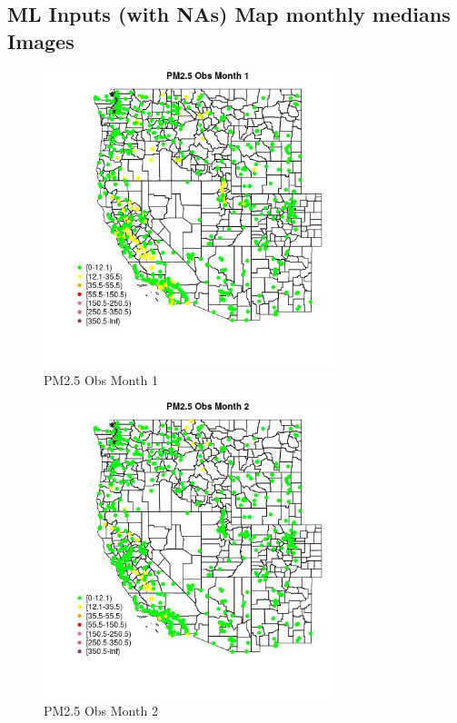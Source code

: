 
\subsection{ML Inputs (with NAs) Map monthly medians Images} 
 

\begin{figure} 
\centering  
\includegraphics[width=0.77\textwidth]{Code_Outputs/Report_ML_input_PM25_Step4_part_f_de_duplicated_aves_prioritize_24hr_obswNAs_MapObsMo1PM25_Obs.jpg} 
\caption{\label{fig:Report_ML_input_PM25_Step4_part_f_de_duplicated_aves_prioritize_24hr_obswNAsMapObsMo1PM25_Obs}PM2.5 Obs Month 1} 
\end{figure} 
 

\begin{figure} 
\centering  
\includegraphics[width=0.77\textwidth]{Code_Outputs/Report_ML_input_PM25_Step4_part_f_de_duplicated_aves_prioritize_24hr_obswNAs_MapObsMo2PM25_Obs.jpg} 
\caption{\label{fig:Report_ML_input_PM25_Step4_part_f_de_duplicated_aves_prioritize_24hr_obswNAsMapObsMo2PM25_Obs}PM2.5 Obs Month 2} 
\end{figure} 
 

